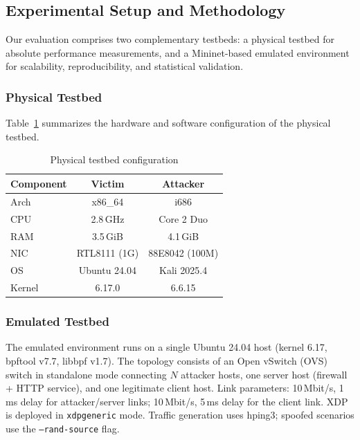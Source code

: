 \documentclass[conference]{IEEEtran}
\begin{document}
\subsection{Experimental Setup and Methodology}

Our evaluation comprises two complementary testbeds: a physical testbed
for absolute performance measurements, and a Mininet-based emulated
environment for scalability, reproducibility, and statistical validation.

\subsubsection{Physical Testbed}

Table~\ref{tab:hardware} summarizes the hardware and software configuration
of the physical testbed.

\begin{table}[h]
\centering
\caption{Physical testbed configuration}
\label{tab:hardware}
\small
\begin{tabular}{|l|c|c|}
\hline
\textbf{Component} & \textbf{Victim} & \textbf{Attacker} \\
\hline
Arch    & x86\_64        & i686 \\
CPU     & 2.8\,GHz       & Core 2 Duo \\
RAM     & 3.5\,GiB       & 4.1\,GiB \\
NIC     & RTL8111 (1G)   & 88E8042 (100M) \\
OS      & Ubuntu 24.04   & Kali 2025.4 \\
Kernel  & 6.17.0         & 6.6.15 \\
\hline
\end{tabular}
\end{table}

\subsubsection{Emulated Testbed}

The emulated environment runs on a single Ubuntu 24.04 host (kernel 6.17,
bpftool v7.7, libbpf v1.7).
The topology consists of an Open vSwitch (OVS) switch in standalone mode
connecting $N$ attacker hosts, one server host (firewall + HTTP service),
and one legitimate client host.
Link parameters: 10\,Mbit/s, 1\,ms delay for attacker/server links;
10\,Mbit/s, 5\,ms delay for the client link.
XDP is deployed in \texttt{xdpgeneric} mode.
Traffic generation uses hping3; spoofed scenarios use the
\texttt{--rand-source} flag.
\end{document}
